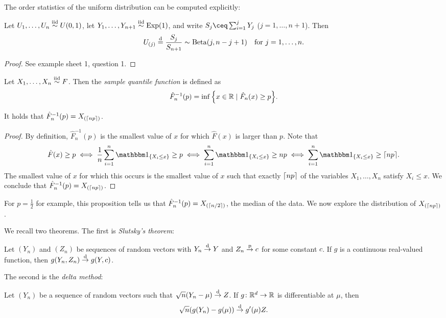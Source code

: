 The order statistics of the uniform distribution can be computed explicitly: 
\begin{proposition}
    Let $U_1, \dotsc, U_n \overset{\mathrm{iid}}{\sim} U(0, 1)$,  let $Y_1, \dotsc, Y_{n+1} \overset{\mathrm{iid}}{\sim} \operatorname{Exp}(1)$, and write $S_j \ceq \sum_{i=1}^j Y_j$ ($j = 1, \dotsc, n+1$). Then
    \[
    U_{(j)} \overset{\mathrm{d}}= \frac{S_j}{S_{n+1}} \sim \mathrm{Beta}(j, n - j + 1) \quad\text{for $j = 1, \dotsc, n$}. 
    \]
\end{proposition}

\begin{proof}
    See example sheet 1, question 1.  
\end{proof}
\begin{definition}
    Let $X_1, \dotsc, X_n \overset{\mathrm{iid}}{\sim} F$. Then the \emph{sample quantile function} is defined as 
    \[
    \hat F_n^{-1}(p) = \inf \qty{x \in \mathbb R\mid \hat F_n(x) \geq p}. 
    \]
\end{definition}

\begin{proposition}
    It holds that $\hat F_n^{-1}(p) = X_{(\lceil np\rceil)}$. 
\end{proposition}

\begin{proof}
    By definition, $\hat F_n^{-1}(p)$ is the smallest value of $x$ for which $\hat F(x)$ is larger than $p$. Note that
    \[
    \hat F(x) \geq p \iff \frac1n \sum_{i=1}^n \ind_\qty{X_i \leq x} \geq p \iff \sum_{i=1}^n \ind_\qty{X_i \leq x} \geq np \iff \sum_{i=1}^n \ind_\qty{X_i \leq x} \geq \ceil{np}.
    \]
    The smallest value of $x$ for which this occurs is the smallest value of $x$ such that exactly $\lceil np\rceil$ of the variables $X_1, \dotsc, X_n$ satisfy $X_i \leq x$. We conclude that $\hat F_n^{-1}(p) = X_{(\lceil np\rceil)}$. 
\end{proof}

For $p = \frac12$ for example, this proposition tells us that $\hat F_n^{-1}(p) = X_{(\lceil n/2\rceil)}$, the median of the data. We now explore the distribution of $X_{(\lceil np\rceil)}$. 

\begin{recap}
We recall two theorems. The first is \emph{Slutsky's theorem}:
\begin{theorem}
    Let $(Y_n)$ and $(Z_n)$ be sequences of random vectors with $Y_n \overset{\mathrm{d}}{\to} Y$ and $Z_n \overset{\mathrm{p}}{\to} c$ for some constant $c$. If $g$ is a continuous real-valued function, then $g(Y_n, Z_n) \overset{\mathrm{d}}{\to} g(Y, c)$. 
\end{theorem}

The second is the \emph{delta method}:
\begin{theorem}
    Let $(Y_n)$ be a sequence of random vectors such that $\sqrt n (Y_n - \mu) \overset{\mathrm{d}}{\to} Z$. If $g \colon \mathbb R^d \to \mathbb R$ is differentiable at $\mu$, then
    \[
    \sqrt n \qty(g(Y_n) - g(\mu)) \overset{\mathrm{d}}{\to} g'(\mu) Z. 
    \]
\end{theorem}
\end{recap}

